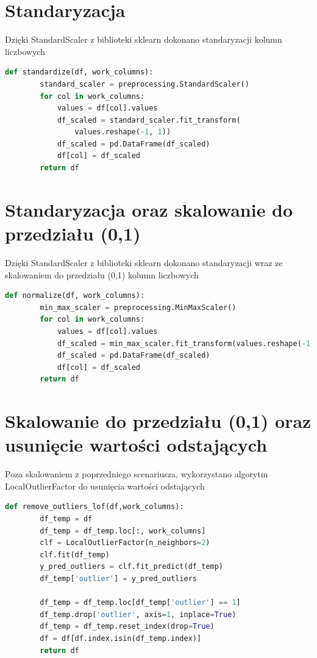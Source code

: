 \documentclass{book}
\begin{document}
\section{Standaryzacja}
Dzięki StandardScaler z biblioteki sklearn dokonano 
standaryzacji kolumn liczbowych

\begin{lstlisting}[language=Python, caption={Standaryzacja 
    kolumn liczbowych}, captionpos=b]
    def standardize(df, work_columns):
        standard_scaler = preprocessing.StandardScaler()
        for col in work_columns:
            values = df[col].values
            df_scaled = standard_scaler.fit_transform(
                values.reshape(-1, 1)) 
            df_scaled = pd.DataFrame(df_scaled)
            df[col] = df_scaled
        return df
\end{lstlisting}

\section{Standaryzacja oraz skalowanie do przedziału (0,1)}
Dzięki StandardScaler z biblioteki sklearn dokonano 
standaryzacji wraz ze skalowaniem do przedziału (0,1) 
kolumn liczbowych

\begin{lstlisting}[language=Python, caption={Skalowanie do 
    przedziału (0,1)}, captionpos=b]
    def normalize(df, work_columns):
        min_max_scaler = preprocessing.MinMaxScaler()
        for col in work_columns:
            values = df[col].values
            df_scaled = min_max_scaler.fit_transform(values.reshape(-1, 1)) 
            df_scaled = pd.DataFrame(df_scaled)
            df[col] = df_scaled
        return df
\end{lstlisting}

\section{Skalowanie do przedziału (0,1) oraz usunięcie 
wartości odstających}
Poza skalowaniem z poprzedniego scenariusza, 
wykorzystano algorytm LocalOutlierFactor do usunięcia 
wartości odstających

\begin{lstlisting}[language=Python, caption={Usuwanie wartości 
    odstających}, captionpos=b]
    def remove_outliers_lof(df,work_columns):
        df_temp = df
        df_temp = df_temp.loc[:, work_columns]
        clf = LocalOutlierFactor(n_neighbors=2)
        clf.fit(df_temp)
        y_pred_outliers = clf.fit_predict(df_temp)
        df_temp['outlier'] = y_pred_outliers

        df_temp = df_temp.loc[df_temp['outlier'] == 1]
        df_temp.drop('outlier', axis=1, inplace=True)
        df_temp = df_temp.reset_index(drop=True)
        df = df[df.index.isin(df_temp.index)]
        return df
\end{lstlisting}
\end{document}
